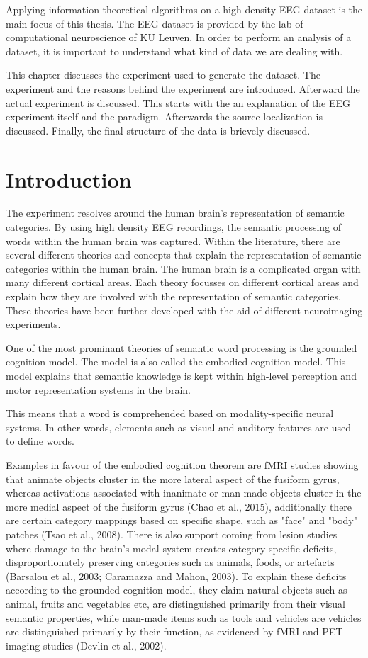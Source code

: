Applying information theoretical algorithms on a high density EEG dataset is the main focus of this thesis. The EEG dataset is provided by the lab of computational neuroscience of KU Leuven. In order to perform an analysis of a dataset, it is important to understand what kind of data we are dealing with.

This chapter discusses the experiment used to generate the dataset. The experiment and the reasons behind the experiment are introduced. Afterward the actual experiment is discussed. This starts with the an explanation of the EEG experiment itself and the paradigm. Afterwards the source localization is discussed. Finally, the final structure of the data is brievely discussed.

\section{Introduction}

The experiment resolves around the human brain's representation of semantic categories. By using high density EEG recordings, the semantic processing of words within the human brain was captured. Within the literature, there are several different theories and concepts that explain the representation of semantic categories within the human brain. The human brain is a complicated organ with many different cortical areas. Each theory focusses on different cortical areas and explain how they are involved with the representation of semantic categories. These theories have been further developed with the aid of different neuroimaging experiments. 

One of the most prominant theories of semantic word processing is the grounded cognition model. The model is also called the embodied cognition model. This model explains that semantic knowledge is kept within high-level perception and motor representation systems in the brain. 

This means that a word is comprehended based on modality-specific neural systems. In other words, elements such as visual and auditory features are used to define words. 


Examples in favour of the embodied cognition theorem are fMRI studies showing that animate objects cluster in the more lateral aspect of the fusiform gyrus, whereas activations associated with inanimate or man-made objects cluster in the more medial aspect of the fusiform gyrus (Chao et al., 2015), additionally there are certain category mappings based on specific shape, such as "face" and "body" patches (Tsao et al., 2008). There is also support coming from lesion studies where damage to the brain's modal system creates category-specific deficits, disproportionately preserving categories such as animals, foods, or artefacts (Barsalou et al., 2003; Caramazza and Mahon, 2003). To explain these deficits according to the grounded cognition model, they claim natural objects such as animal, fruits and vegetables etc, are distinguished primarily from their visual semantic properties, while man-made items such as tools and vehicles are vehicles are distinguished primarily by their function, as evidenced by fMRI and PET imaging studies (Devlin et al., 2002).

